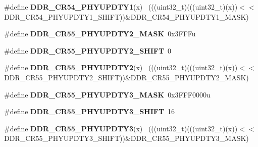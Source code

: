\begin{DoxyCompactItemize}
\item 
\hypertarget{group___d_d_r___register___masks_ga3d47da3cd4e2bb927e91190bc1051b54}{}\#define {\bfseries D\+D\+R\+\_\+\+C\+R54\+\_\+\+P\+H\+Y\+U\+P\+D\+T\+Y1}(x)                                    ~(((uint32\+\_\+t)(((uint32\+\_\+t)(x))$<$$<$D\+D\+R\+\_\+\+C\+R54\+\_\+\+P\+H\+Y\+U\+P\+D\+T\+Y1\+\_\+\+S\+H\+I\+F\+T))\&D\+D\+R\+\_\+\+C\+R54\+\_\+\+P\+H\+Y\+U\+P\+D\+T\+Y1\+\_\+\+M\+A\+S\+K)\label{group___d_d_r___register___masks_ga3d47da3cd4e2bb927e91190bc1051b54}

\item 
\hypertarget{group___d_d_r___register___masks_ga8670c8fd96d6cae3a283c2dac55b83b6}{}\#define {\bfseries D\+D\+R\+\_\+\+C\+R55\+\_\+\+P\+H\+Y\+U\+P\+D\+T\+Y2\+\_\+\+M\+A\+S\+K}~0x3\+F\+F\+Fu\label{group___d_d_r___register___masks_ga8670c8fd96d6cae3a283c2dac55b83b6}

\item 
\hypertarget{group___d_d_r___register___masks_gad8469e8733e20a5756a04fcc1f05e7de}{}\#define {\bfseries D\+D\+R\+\_\+\+C\+R55\+\_\+\+P\+H\+Y\+U\+P\+D\+T\+Y2\+\_\+\+S\+H\+I\+F\+T}~0\label{group___d_d_r___register___masks_gad8469e8733e20a5756a04fcc1f05e7de}

\item 
\hypertarget{group___d_d_r___register___masks_ga8c2ad6f83d80fac5314688ad39247de8}{}\#define {\bfseries D\+D\+R\+\_\+\+C\+R55\+\_\+\+P\+H\+Y\+U\+P\+D\+T\+Y2}(x)                                    ~(((uint32\+\_\+t)(((uint32\+\_\+t)(x))$<$$<$D\+D\+R\+\_\+\+C\+R55\+\_\+\+P\+H\+Y\+U\+P\+D\+T\+Y2\+\_\+\+S\+H\+I\+F\+T))\&D\+D\+R\+\_\+\+C\+R55\+\_\+\+P\+H\+Y\+U\+P\+D\+T\+Y2\+\_\+\+M\+A\+S\+K)\label{group___d_d_r___register___masks_ga8c2ad6f83d80fac5314688ad39247de8}

\item 
\hypertarget{group___d_d_r___register___masks_ga790e1b5714700bc464229c8a08be22ed}{}\#define {\bfseries D\+D\+R\+\_\+\+C\+R55\+\_\+\+P\+H\+Y\+U\+P\+D\+T\+Y3\+\_\+\+M\+A\+S\+K}~0x3\+F\+F\+F0000u\label{group___d_d_r___register___masks_ga790e1b5714700bc464229c8a08be22ed}

\item 
\hypertarget{group___d_d_r___register___masks_gaee52180d3e7e70b654f54f693ca12eca}{}\#define {\bfseries D\+D\+R\+\_\+\+C\+R55\+\_\+\+P\+H\+Y\+U\+P\+D\+T\+Y3\+\_\+\+S\+H\+I\+F\+T}~16\label{group___d_d_r___register___masks_gaee52180d3e7e70b654f54f693ca12eca}

\item 
\hypertarget{group___d_d_r___register___masks_gae83d1074ed06eb220de7af407f87b02e}{}\#define {\bfseries D\+D\+R\+\_\+\+C\+R55\+\_\+\+P\+H\+Y\+U\+P\+D\+T\+Y3}(x)                                    ~(((uint32\+\_\+t)(((uint32\+\_\+t)(x))$<$$<$D\+D\+R\+\_\+\+C\+R55\+\_\+\+P\+H\+Y\+U\+P\+D\+T\+Y3\+\_\+\+S\+H\+I\+F\+T))\&D\+D\+R\+\_\+\+C\+R55\+\_\+\+P\+H\+Y\+U\+P\+D\+T\+Y3\+\_\+\+M\+A\+S\+K)\label{group___d_d_r___register___masks_gae83d1074ed06eb220de7af407f87b02e}


\end{DoxyCompactItemize}

